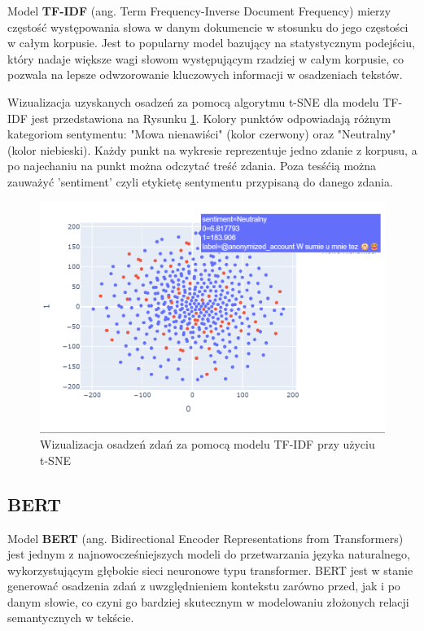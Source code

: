 \documentclass[12pt]{article}
\begin{document}
Model \textbf{TF-IDF} (ang. Term Frequency-Inverse Document Frequency) mierzy częstość występowania słowa w danym dokumencie w stosunku do jego częstości w całym korpusie. Jest to popularny model bazujący na statystycznym podejściu, który nadaje większe wagi słowom występującym rzadziej w całym korpusie, co pozwala na lepsze odwzorowanie kluczowych informacji w osadzeniach tekstów.

Wizualizacja uzyskanych osadzeń za pomocą algorytmu t-SNE dla modelu TF-IDF jest przedstawiona na Rysunku \ref{fig:tfidf_tsne}. Kolory punktów odpowiadają różnym kategoriom sentymentu: "Mowa nienawiści" (kolor czerwony) oraz "Neutralny" (kolor niebieski). Każdy punkt na wykresie reprezentuje jedno zdanie z korpusu, a po najechaniu na punkt można odczytać treść zdania. Poza tesśćią można zauważyć 'sentiment' czyli etykietę sentymentu przypisaną do danego zdania.

\begin{figure}[H]
    \centering
    \includegraphics[width=\textwidth]{../../plots/tf-idf-t-sne.png}
    \caption{Wizualizacja osadzeń zdań za pomocą modelu TF-IDF przy użyciu t-SNE}
    \label{fig:tfidf_tsne}
\end{figure}

\subsection{BERT}

Model \textbf{BERT} (ang. Bidirectional Encoder Representations from Transformers) jest jednym z najnowocześniejszych modeli do przetwarzania języka naturalnego, wykorzystującym głębokie sieci neuronowe typu transformer. BERT jest w stanie generować osadzenia zdań z uwzględnieniem kontekstu zarówno przed, jak i po danym słowie, co czyni go bardziej skutecznym w modelowaniu złożonych relacji semantycznych w tekście.
\end{document}
